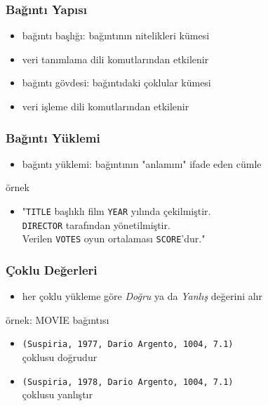 \documentclass[dvipsnames]{beamer}
\theoremstyle{plain}
\begin{document}
\begin{frame}
  \frametitle{Bağıntı Yapısı}

     \begin{itemize}
      \item bağıntı başlığı: bağıntının nitelikleri kümesi
      \item veri tanımlama dili komutlarından etkilenir

  \medskip
      \item bağıntı gövdesi: bağıntıdaki çoklular kümesi
      \item veri işleme dili komutlarından etkilenir
    \end{itemize}
\end{frame}

\begin{frame}
  \frametitle{Bağıntı Yüklemi}
  \begin{itemize}
    \item \alert{bağıntı yüklemi}: bağıntının "anlamını" ifade eden cümle
   \end{itemize}

\medskip
  \begin{exampleblock}{örnek}
    \begin{itemize}
      \item "\texttt{TITLE} başlıklı film \texttt{YEAR} yılında çekilmiştir.\\
	 \texttt{DIRECTOR} tarafından yönetilmiştir.\\
	 Verilen \texttt{VOTES} oyun ortalaması \texttt{SCORE}'dur."
    \end{itemize}
  \end{exampleblock}
   
\end{frame}

\begin{frame}
  \frametitle{Çoklu Değerleri}

   \begin{itemize}
      \item her çoklu yükleme göre \emph{Doğru} ya da \emph{Yanlış} değerini alır
    \end{itemize}
    

    \begin{exampleblock}{örnek: MOVIE bağıntısı}
    \begin{itemize}
      \item \texttt{(Suspiria, 1977, Dario Argento, 1004, 7.1)}\\
        çoklusu doğrudur
      \item \texttt{(Suspiria, 1978, Dario Argento, 1004, 7.1)}\\
        çoklusu yanlıştır
    \end{itemize}
  \end{exampleblock}
\end{frame}
\end{document}
